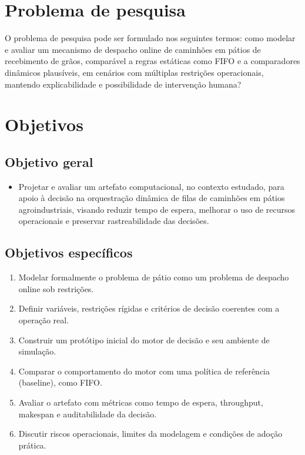 \documentclass[
  12pt,
  oneside,
  a4paper,
  sumario=tradicional,
  brazil
]{abntex2}
\begin{document}
\chapter{Problema de pesquisa}
O problema de pesquisa pode ser formulado nos seguintes termos: como modelar e avaliar um mecanismo de despacho online de caminh\~oes em p\'atios de recebimento de gr\~aos, compar\'avel a regras est\'aticas como FIFO e a comparadores din\^amicos plaus\'iveis, em cen\'arios com m\'ultiplas restri\c{c}\~oes operacionais, mantendo explicabilidade e possibilidade de interven\c{c}\~ao humana?

\chapter{Objetivos}
\section{Objetivo geral}
\begin{itemize}[leftmargin=1.27cm,itemsep=0pt,topsep=0pt,parsep=0pt,partopsep=0pt]
  \item Projetar e avaliar um artefato computacional, no contexto estudado, para apoio \`a decis\~ao na orquestra\c{c}\~ao din\^amica de filas de caminh\~oes em p\'atios agroindustriais, visando reduzir tempo de espera, melhorar o uso de recursos operacionais e preservar rastreabilidade das decis\~oes.
\end{itemize}

\section{Objetivos específicos}
\begin{enumerate}[leftmargin=1.27cm,itemsep=0pt,topsep=0pt,parsep=0pt,partopsep=0pt]
  \item Modelar formalmente o problema de p\'atio como um problema de despacho online sob restri\c{c}\~oes.
  \item Definir vari\'aveis, restri\c{c}\~oes r\'igidas e crit\'erios de decis\~ao coerentes com a opera\c{c}\~ao real.
  \item Construir um prot\'otipo inicial do motor de decis\~ao e seu ambiente de simula\c{c}\~ao.
  \item Comparar o comportamento do motor com uma pol\'itica de refer\^encia (baseline), como FIFO.
  \item Avaliar o artefato com m\'etricas como tempo de espera, throughput, makespan e auditabilidade da decis\~ao.
  \item Discutir riscos operacionais, limites da modelagem e condi\c{c}\~oes de ado\c{c}\~ao pr\'atica.
\end{enumerate}
\end{document}
